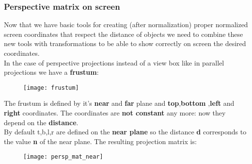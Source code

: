 \subsubsection{Perspective matrix on screen}
Now that we have basic tools for creating (after normalization) proper normalized screen coordinates that respect the distance of objects we need to combine these new tools with transformations to be able to show correctly on screen the desired coordinates.\\
In the case of perspective projections instead of a view box like in parallel projections we have a \textbf{frustum}:
\begin{figure}[H]
 \centering
  \texttt{[image: frustum]}
\end{figure}
The frustum is defined by it's \textbf{near} and \textbf{far} plane and \textbf{top},\textbf{bottom} ,\textbf{left} and \textbf{right} coordinates.
The coordinates are \textbf{not constant} any more: now they depend on the \textbf{distance}.\\
By default t,b,l,r are defined on the \textbf{near plane} so the distance \textbf{d} corresponds to the value \textbf{n} of the near plane. The resulting projection matrix is:
\begin{figure}[H]
 \centering
  \texttt{[image: persp\_mat\_near]}
\end{figure}
